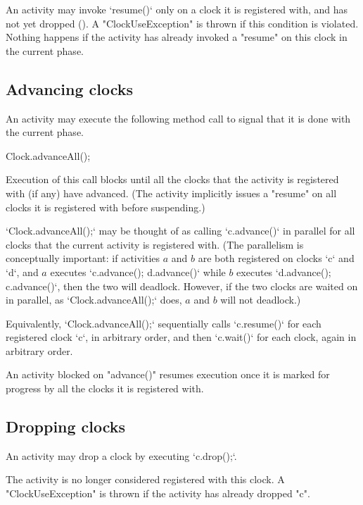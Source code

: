 An activity may invoke \xcd`resume()` only on a clock it is registered with,
and has not yet dropped (). A
\xcd"ClockUseException" is thrown if this
condition is violated. Nothing happens if the activity has already invoked a
\xcd"resume" on this clock in the current phase.

\subsection{Advancing clocks}\label{sec:clock:next}
An activity may execute the following method call to signal that it is done
with the current phase.
\begin{xten}
Clock.advanceAll();
\end{xten}

\noindent 
Execution of this call blocks until all the clocks that the
activity is registered with (if any) have advanced. (The activity
implicitly issues a \xcd"resume" on all clocks it is registered
with before suspending.)

\xcd`Clock.advanceAll();` may be thought of as calling \xcd`c.advance()` in parallel for all
clocks that the current activity is registered with.  (The parallelism is
conceptually important: if activities {$a$} and {$b$} are both
registered on clocks \xcd`c` and \xcd`d`, and {$a$} executes
\xcd`c.advance(); d.advance()` while {$b$} executes \xcd`d.advance(); c.advance()`,
then the two will deadlock.  However, if the two clocks are waited on in
parallel, as \xcd`Clock.advanceAll();` does, {$a$} and {$b$} will not deadlock.)

Equivalently, \xcd`Clock.advanceAll();` sequentially calls \xcd`c.resume()` for each
registered clock \xcd`c`, in arbitrary order, and then \xcd`c.wait()` for each
clock, again in arbitrary order.  



An activity blocked on \xcd"advance()" resumes execution once
it is marked for progress by all the clocks it is registered with.

\subsection{Dropping clocks}\label{sec:clock:drop}
An activity may drop a clock by executing \xcd`c.drop();`.



\noindent{} The activity is no longer considered registered with this
clock.  A \xcd"ClockUseException" is thrown if the activity has
already dropped \xcd"c".

